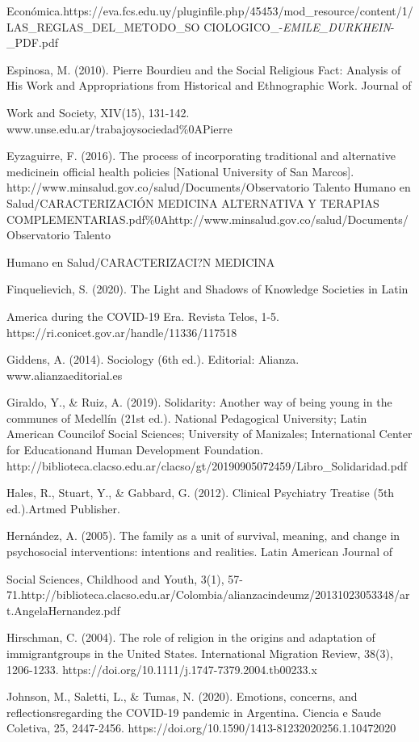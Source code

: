 \documentclass{article}
\begin{document}
Económica.https://eva.fcs.edu.uy/pluginfile.php/45453/mod\_resource/content/1/LAS\_REGLAS\_DEL\_METODO\_SO CIOLOGICO\_-\textit{EMILE\_DURKHEIN}-\_PDF.pdf

Espinosa, M. (2010). Pierre Bourdieu and the Social Religious Fact: Analysis of His Work and Appropriations from Historical and Ethnographic Work. Journal of

Work and Society, XIV(15), 131-142. www.unse.edu.ar/trabajoysociedad\%0APierre

Eyzaguirre, F. (2016). The process of incorporating traditional and alternative medicinein official health policies [National University of San Marcos]. http://www.minsalud.gov.co/salud/Documents/Observatorio Talento Humano en Salud/CARACTERIZACIÓN MEDICINA ALTERNATIVA Y TERAPIAS COMPLEMENTARIAS.pdf\%0Ahttp://www.minsalud.gov.co/salud/Documents/Observatorio Talento

Humano en Salud/CARACTERIZACI?N MEDICINA

Finquelievich, S. (2020). The Light and Shadows of Knowledge Societies in Latin

America during the COVID-19 Era. Revista Telos, 1-5. https://ri.conicet.gov.ar/handle/11336/117518

Giddens, A. (2014). Sociology (6th ed.). Editorial: Alianza. www.alianzaeditorial.es

Giraldo, Y., \& Ruiz, A. (2019). Solidarity: Another way of being young in the communes of Medellín (21st ed.). National Pedagogical University; Latin American Councilof Social Sciences; University of Manizales; International Center for Educationand Human Development Foundation. http://biblioteca.clacso.edu.ar/clacso/gt/20190905072459/Libro\_Solidaridad.pdf

Hales, R., Stuart, Y., \& Gabbard, G. (2012). Clinical Psychiatry Treatise (5th ed.).Artmed Publisher.

Hernández, A. (2005). The family as a unit of survival, meaning, and change in psychosocial interventions: intentions and realities. Latin American Journal of

Social Sciences, Childhood and Youth, 3(1), 57- 71.http://biblioteca.clacso.edu.ar/Colombia/alianzacindeumz/20131023053348/art.AngelaHernandez.pdf

Hirschman, C. (2004). The role of religion in the origins and adaptation of immigrantgroups in the United States. International Migration Review, 38(3), 1206-1233. https://doi.org/10.1111/j.1747-7379.2004.tb00233.x

Johnson, M., Saletti, L., \& Tumas, N. (2020). Emotions, concerns, and reflectionsregarding the COVID-19 pandemic in Argentina. Ciencia e Saude Coletiva, 25, 2447-2456. https://doi.org/10.1590/1413-81232020256.1.10472020
\end{document}
